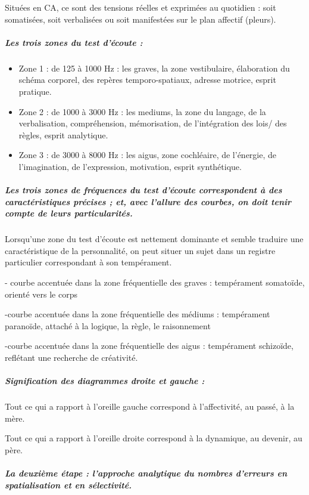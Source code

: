 \documentclass[12pt,french]{report}
\begin{document}
Situées en CA, ce sont des tensions réelles et exprimées au quotidien
: soit somatisées, soit verbalisées ou soit manifestées sur le plan
affectif (pleurs).

\subparagraph{Les trois zones du test d'écoute : }
\begin{itemize}
\item Zone 1 : de 125 à 1000 Hz : les graves, la zone vestibulaire, élaboration
du schéma corporel, des repères temporo-spatiaux, adresse motrice,
esprit pratique.
\item Zone 2 : de 1000 à 3000 Hz : les mediums, la zone du langage, de la
verbalisation, compréhension, mémorisation, de l'intégration des lois/
des règles, esprit analytique.
\item Zone 3 : de 3000 à 8000 Hz : les aigus, zone cochléaire, de l'énergie,
de l'imagination, de l'expression, motivation, esprit synthétique.
\end{itemize}

\subparagraph{Les trois zones de fréquences du test d'écoute correspondent à des
caractéristiques précises ; et, avec l'allure des courbes, on doit
tenir compte de leurs particularités.}

Lorsqu'une zone du test d'écoute est nettement dominante et semble
traduire une caractéristique de la personnalité, on peut situer un
sujet dans un registre particulier correspondant à son tempérament.

- courbe accentuée dans la zone fréquentielle des graves : tempérament
somatoïde, orienté vers le corps

-courbe accentuée dans la zone fréquentielle des médiums : tempérament
paranoïde, attaché à la logique, la règle, le raisonnement 

-courbe accentuée dans la zone fréquentielle des aigus : tempérament
schizoïde, reflétant une recherche de créativité.

\subparagraph{Signification des diagrammes droite et gauche : }

Tout ce qui a rapport à l'oreille gauche correspond à l\textquoteright affectivité,
au passé, à la mère. 

Tout ce qui a rapport à l'oreille droite correspond à la dynamique,
au devenir, au père. 

\subparagraph{La deuxième étape : l'approche analytique du nombres d'erreurs en
spatialisation et en sélectivité.}
\end{document}
